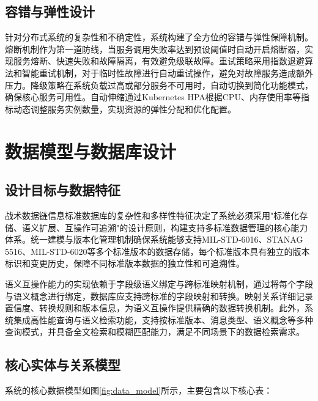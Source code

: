 \subsection{容错与弹性设计}

针对分布式系统的复杂性和不确定性，系统构建了全方位的容错与弹性保障机制。熔断机制作为第一道防线，当服务调用失败率达到预设阈值时自动开启熔断器，实现服务熔断、快速失败和故障隔离，有效避免级联故障。重试策略采用指数退避算法和智能重试机制，对于临时性故障进行自动重试操作，避免对故障服务造成额外压力。降级策略在系统负载过高或部分服务不可用时，自动切换到简化功能模式，确保核心服务可用性。自动伸缩通过Kubernetes HPA根据CPU、内存使用率等指标动态调整服务实例数量，实现资源的弹性分配和优化配置。

\section{数据模型与数据库设计}

\subsection{设计目标与数据特征}

战术数据链信息标准数据库的复杂性和多样性特征决定了系统必须采用"标准化存储、语义扩展、互操作可追溯"的设计原则，构建支持多标准数据管理的核心能力体系。统一建模与版本化管理机制确保系统能够支持MIL-STD-6016、STANAG 5516、MIL-STD-6020等多个标准版本的数据存储，每个标准版本具有独立的版本标识和变更历史，保障不同标准版本数据的独立性和可追溯性。

语义互操作能力的实现依赖于字段级语义绑定与跨标准映射机制，通过将每个字段与语义概念进行绑定，数据库应支持跨标准的字段映射和转换。映射关系详细记录置信度、转换规则和版本信息，为语义互操作提供精确的数据转换机制。此外，系统集成高性能查询与语义检索功能，支持按标准版本、消息类型、语义概念等多种查询模式，并具备全文检索和模糊匹配能力，满足不同场景下的数据检索需求。

\subsection{核心实体与关系模型}

系统的核心数据模型如图\ref{fig:data_model}所示，主要包含以下核心表：

